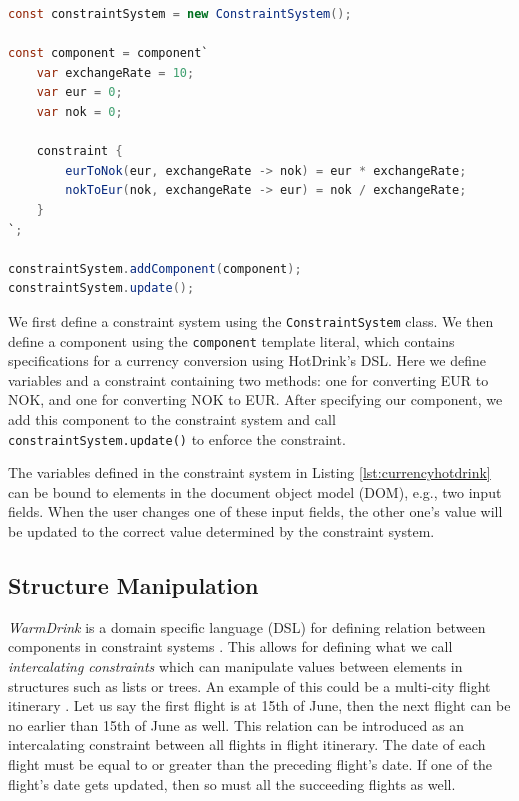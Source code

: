 \documentclass[11pt, a4paper]{article}
\begin{document}
\begin{lstlisting}[language=java, caption={Currency conversion in HotDrink.}, label={lst:currencyhotdrink}]
const constraintSystem = new ConstraintSystem();

const component = component`
    var exchangeRate = 10;
    var eur = 0;
    var nok = 0;

    constraint {
        eurToNok(eur, exchangeRate -> nok) = eur * exchangeRate;
        nokToEur(nok, exchangeRate -> eur) = nok / exchangeRate;
    }
`;

constraintSystem.addComponent(component);
constraintSystem.update();
\end{lstlisting}

We first define a constraint system using the \texttt{ConstraintSystem} class. We then define a component using the \texttt{component} template literal, which contains specifications for a currency conversion using HotDrink's DSL. Here we define variables and a constraint containing two methods: one for converting EUR to NOK, and one for converting NOK to EUR. After specifying our component, we add this component to the constraint system and call \texttt{constraintSystem.update()} to enforce the constraint.

The variables defined in the constraint system in Listing \ref{lst:currencyhotdrink} can be bound to elements in the document object model (DOM), e.g., two input fields. When the user changes one of these input fields, the other one's value will be updated to the correct value determined by the constraint system.

\subsection{Structure Manipulation}
\label{sec:structuremanipulation}
\textit{WarmDrink} is a domain specific language (DSL) for defining relation between components in constraint systems \cite{warmdrink}. This allows for defining what we call \textit{intercalating constraints} which can manipulate values between elements in structures such as lists or trees. An example of this could be a multi-city flight itinerary \cite{warmdrink}. Let us say the first flight is at 15th of June, then the next flight can be no earlier than 15th of June as well. This relation can be introduced as an intercalating constraint between all flights in flight itinerary. The date of each flight must be equal to or greater than the preceding flight's date. If one of the flight's date gets updated, then so must all the succeeding flights as well.
\end{document}
